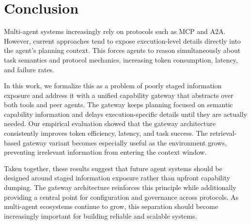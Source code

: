 \section{Conclusion}

Multi-agent systems increasingly rely on protocols such as MCP and A2A.
However, current approaches tend to expose execution-level details directly into the agent's planning context. 
This forces agents to reason simultaneously about task semantics and protocol mechanics, increasing token consumption, latency, and failure rates.

In this work, we formalize this as a problem of poorly staged information exposure and address it with a unified capability gateway that abstracts over both tools and peer agents. 
The gateway keeps planning focused on semantic capability information and delays execution-specific details until they are actually needed.
Our empirical evaluation showed that the gateway architecture consistently improves token efficiency, latency, and task success. 
The retrieval-based gateway variant becomes especially useful as the environment grows, preventing irrelevant information from entering the context window.

Taken together, these results suggest that future agent systems should be designed around staged information exposure rather than upfront capability dumping.
The gateway architecture reinforces this principle while additionally providing a central point for configuration and governance across protocols.
As multi-agent ecosystems continue to grow, this separation should become increasingly important for building reliable and scalable systems.